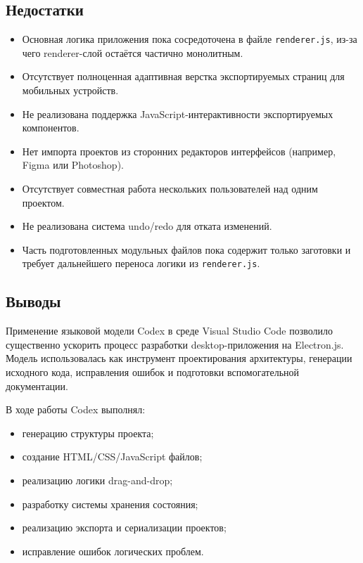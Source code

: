 \documentclass[14pt,a4paper]{extarticle}
\begin{document}
{{\subsection{Недостатки}

\begin{itemize}
    \item Основная логика приложения пока сосредоточена в файле \texttt{renderer.js}, из-за чего renderer-слой остаётся частично монолитным.

    \item Отсутствует полноценная адаптивная верстка экспортируемых страниц для мобильных устройств.

    \item Не реализована поддержка JavaScript-интерактивности экспортируемых компонентов.

    \item Нет импорта проектов из сторонних редакторов интерфейсов (например, Figma или Photoshop).

    \item Отсутствует совместная работа нескольких пользователей над одним проектом.

    \item Не реализована система undo/redo для отката изменений.

    \item Часть подготовленных модульных файлов пока содержит только заготовки и требует дальнейшего переноса логики из \texttt{renderer.js}.
\end{itemize}

\subsection{Выводы}

Применение языковой модели Codex в среде Visual Studio Code позволило существенно ускорить процесс разработки desktop-приложения на Electron.js. Модель использовалась как инструмент проектирования архитектуры, генерации исходного кода, исправления ошибок и подготовки вспомогательной документации.

В ходе работы Codex выполнял:
\begin{itemize}
    \item генерацию структуры проекта;
    \item создание HTML/CSS/JavaScript файлов;
    \item реализацию логики drag-and-drop;
    \item разработку системы хранения состояния;
    \item реализацию экспорта и сериализации проектов;
    \item исправление ошибок логических проблем.
\end{itemize}

}}
\end{document}
